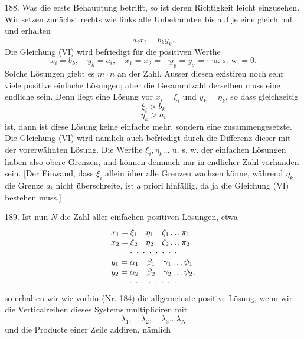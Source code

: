 188.  Was die erste Behauptung betrifft, so ist deren Richtigkeit leicht einzusehen. Wir setzen zunächst rechts wie links alle Unbekannten bis auf je eine gleich null und erhalten
\[ a_i x_i = b_k y_k. \]
Die Gleichung (VI) wird befriedigt für die positiven Werthe
\[ x_i = b_k, \quad y_k = a_i, \quad x_1 = x_2 = \cdots y_\varrho = y_\sigma = \cdots \text{u. s. w.} = 0. \]
Solche Lösungen giebt es $m \cdot n$ an der Zahl. Ausser diesen existiren noch sehr viele positive einfache Lösungen; aber die Gesammtzahl derselben muss eine endliche sein. Denn liegt eine Lösung vor $x_i = \xi_i$ und $y_k = \eta_k$, so dass gleichzeitig
\[ \xi_i > b_k \]
\[ \eta_k > a_i \]
ist, dann ist diese Lösung keine einfache mehr, sondern eine zusammengesetzte. Die Gleichung (VI) wird nämlich auch befriedigt durch die Differenz dieser mit der vorerwähnten Lösung. Die Werthe $\xi_i, \eta_k \ldots$ u. s. w. der einfachen Lösungen haben also obere Grenzen, und können demnach nur in endlicher Zahl vorhanden sein. [Der Einwand, dass $\xi_i$ allein über alle Grenzen wachsen könne, während $\eta_k$ die Grenze $a_i$ nicht überschreite, ist a priori hinfällig, da ja die Gleichung (VI) bestehen muss.]

189.  Ist nun $N$ die Zahl aller einfachen positiven Lösungen, etwa
\[
\begin{array}{l}
x_1 = \xi_1 \quad \eta_1 \quad \zeta_1 \ldots \pi_1 \\
x_2 = \xi_2 \quad \eta_2 \quad \zeta_2 \ldots \pi_2 \\
\hphantom{x_2 =} \cdot \; \cdot \; \cdot \; \cdot \; \cdot \; \cdot \; \cdot \; \cdot \\
y_1 = \alpha_1 \quad \beta_1 \quad \gamma_1 \ldots \psi_1 \\
y_2 = \alpha_2 \quad \beta_2 \quad \gamma_2 \ldots \psi_2, \\
\hphantom{y_2 =} \cdot \; \cdot \; \cdot \; \cdot \; \cdot \; \cdot \; \cdot \; \cdot
\end{array}
\]
so erhalten wir wie vorhin (Nr. 184) die allgemeinste positive Lösung, wenn wir die Verticalreihen dieses Systems multipliciren mit
\[ \lambda_1, \quad \lambda_2, \quad \lambda_3 \ldots \lambda_N \]
und die Producte einer Zeile addiren, nämlich


